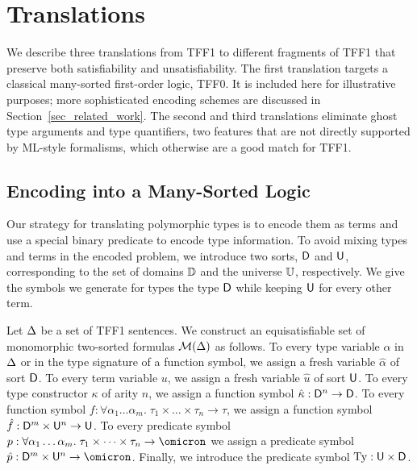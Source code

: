 \section{Translations} \label{sec:trans}

We describe three translations from TFF1 to different fragments of TFF1 that
preserve both satisfiability and unsatisfiability. The first translation targets
a classical many-sorted first-order logic, TFF0. It is included here for
illustrative purposes; more sophisticated encoding schemes are discussed in
Section~\ref{sec_related_work}. The second and third translations eliminate
ghost type arguments and type quantifiers, two features that are not directly
supported by ML-style formalisms, which otherwise are a good match for TFF1.

\subsection{Encoding into a Many-Sorted Logic} \label{ssec:tff0}

Our strategy for translating polymorphic types is to encode them as terms and
use a special binary predicate to encode type information. To avoid mixing types
and terms in the encoded problem, we introduce two sorts, $\mathsf{D}$ and $\mathsf{U}$,
corresponding to the set of domains $\mathbb{D}$ and the universe $\mathbb{U}$,
respectively. We give the symbols we generate for types the type $\mathsf{D}$ while
keeping $\mathsf{U}$ for every other term.

Let $\mathrm{\Delta}$ be a set of TFF1 sentences.
We construct an equisatisfiable set of monomorphic two-sorted
formulas $\mathcal{M}(\mathrm{\Delta})$ as follows.
%
To every type variable $\alpha$ in $\mathrm{\Delta}$ or in the type signature of a function
symbol, we assign a fresh variable $\hat{\alpha}$ of sort $\mathsf{D}$.
To every term variable $u$, we assign
a fresh variable $\hat{u}$ of sort $\mathsf{U}$.
To every type constructor $\kappa$ of arity $n$, we assign
a function symbol $\hat{\kappa} : \mathsf{D}^n \to \mathsf{D}$.
To every function symbol $f : \forall \alpha_1\dots\alpha_m .\; \tau_1 \times \dots \times \tau_n \to \tau$,
we assign a function symbol $\hat{f} : \mathsf{D}^m \times \mathsf{U}^n \to \mathsf{U}$.
To every predicate symbol $p : \forall \alpha_1\dots\alpha_m .\; \tau_1 \times \dots \times \tau_n \to \omicron$
we assign a predicate symbol $\hat{p} : \typ^m \times \und^n \to \omicron$.
Finally, we introduce the predicate symbol $\mathrm{Ty} : \mathsf{U} \times \mathsf{D}$.

